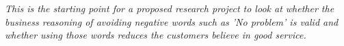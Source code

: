 \textit{This is the starting point for a proposed research project to look at whether the business reasoning of avoiding negative words such as 'No problem' is valid and whether using those words reduces the customers believe in good service.}
